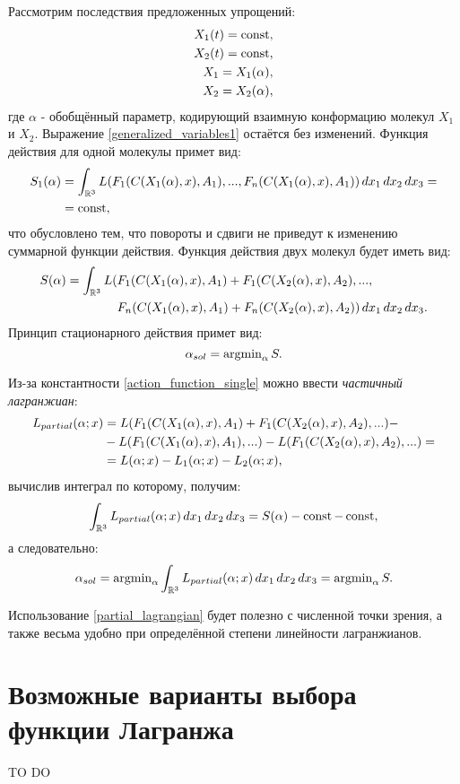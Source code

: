 Рассмотрим последствия предложенных упрощений:
\begin{align}
	X_1(t) = \operatorname{const}, \\
	X_2(t) = \operatorname{const}, \\
	X_1 = X_1(\alpha), \\
	X_2 = X_2(\alpha),
\end{align}
где $\alpha$ - обобщённый параметр, кодирующий взаимную конформацию молекул $X_1$ и $X_2$. Выражение \ref{generalized_variables1} остаётся без изменений.
Функция действия для одной молекулы примет вид:
\begin{align}
	S_1(\alpha) &= \int_{\mathbb{R}^3}L(F_1(C(X_1(\alpha), x), A_1), ...,F_n(C(X_1(\alpha), x), A_1)) \, dx_1 \, dx_2 \, dx_3 = \notag \\
				 &= \operatorname{const},
	\label{action_function_single}
\end{align}
что обусловлено тем, что повороты и сдвиги не приведут к изменению суммарной функции действия. Функция действия двух молекул будет иметь вид:
\begin{align}
	S(\alpha) = \int_{\mathbb{R}^3}L(&F_1(C(X_1(\alpha), x), A_1)+F_1(C(X_2(\alpha), x), A_2), ..., \notag \\
                                                     &F_n(C(X_1(\alpha), x), A_1) + F_n(C(X_2(\alpha), x), A_2)) \, dx_1 \, dx_2 \, dx_3.
	\label{action_function_two}
\end{align}
Принцип стационарного действия примет вид:
\begin{equation}
	\alpha_{sol} = \operatorname{argmin}_{\alpha}S.
	\label{lagrangian_principle_practical}
\end{equation}

Из-за константности \ref{action_function_single} можно ввести \textit{частичный лагранжиан}:
\begin{align}
	L_{partial}(\alpha; x) &= L(F_1(C(X_1(\alpha), x), A_1)+F_1(C(X_2(\alpha), x), A_2), ...) - \notag \\
						   &- L(F_1(C(X_1(\alpha), x), A_1), ...) -  L(F_1(C(X_2(\alpha), x), A_2), ...) = \notag \\
						   &= L(\alpha; x) - L_1(\alpha; x) - L_2(\alpha; x),
	\label{partial_lagrangian}
\end{align}
вычислив интеграл по которому, получим:
\begin{equation}
	\int_{\mathbb{R}^3}L_{partial}(\alpha; x) \, dx_1 \, dx_2 \, dx_3 = S(\alpha) - \operatorname{const} - \operatorname{const},
\end{equation}
а следовательно:
\begin{equation}
	\alpha_{sol} = \operatorname{argmin}_{\alpha}\int_{\mathbb{R}^3}L_{partial}(\alpha; x) \, dx_1 \, dx_2 \, dx_3 = \operatorname{argmin}_{\alpha}S.
	\label{lagrangian_principle_practical_partial}
\end{equation}

Использование \ref{partial_lagrangian} будет полезно с численной точки зрения, а также весьма удобно при определённой степени линейности лагранжианов.

\section{Возможные варианты выбора функции Лагранжа}
TO DO





